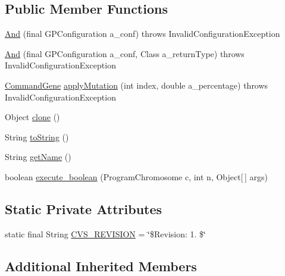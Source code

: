 \subsection*{Public Member Functions}
\begin{DoxyCompactItemize}
\item 
\hyperlink{classorg_1_1jgap_1_1gp_1_1function_1_1_and_a9590098f07206c5509bb3240f451850b}{And} (final G\-P\-Configuration a\-\_\-conf)  throws Invalid\-Configuration\-Exception 
\item 
\hyperlink{classorg_1_1jgap_1_1gp_1_1function_1_1_and_a3b73669d56f63914489c48c35ab21998}{And} (final G\-P\-Configuration a\-\_\-conf, Class a\-\_\-return\-Type)  throws Invalid\-Configuration\-Exception 
\item 
\hyperlink{classorg_1_1jgap_1_1gp_1_1_command_gene}{Command\-Gene} \hyperlink{classorg_1_1jgap_1_1gp_1_1function_1_1_and_aaaf346d217ba4d386463aa9c1293dc7f}{apply\-Mutation} (int index, double a\-\_\-percentage)  throws Invalid\-Configuration\-Exception 
\item 
Object \hyperlink{classorg_1_1jgap_1_1gp_1_1function_1_1_and_aaee3b30e638bdc0940356575d0eb6fb6}{clone} ()
\item 
String \hyperlink{classorg_1_1jgap_1_1gp_1_1function_1_1_and_a8f45e93083bd636361be7f6baa087494}{to\-String} ()
\item 
String \hyperlink{classorg_1_1jgap_1_1gp_1_1function_1_1_and_af5bbc6a74a460d83f34b69ac8a73bfbd}{get\-Name} ()
\item 
boolean \hyperlink{classorg_1_1jgap_1_1gp_1_1function_1_1_and_a12e2fcecf9075fbe0be2ce082387da0d}{execute\-\_\-boolean} (Program\-Chromosome c, int n, Object\mbox{[}$\,$\mbox{]} args)
\end{DoxyCompactItemize}
\subsection*{Static Private Attributes}
\begin{DoxyCompactItemize}
\item 
static final String \hyperlink{classorg_1_1jgap_1_1gp_1_1function_1_1_and_a8767e982e4da35105d1152c0e35e10e5}{C\-V\-S\-\_\-\-R\-E\-V\-I\-S\-I\-O\-N} = \char`\"{}\$Revision\-: 1. \$\char`\"{}
\end{DoxyCompactItemize}
\subsection*{Additional Inherited Members}


